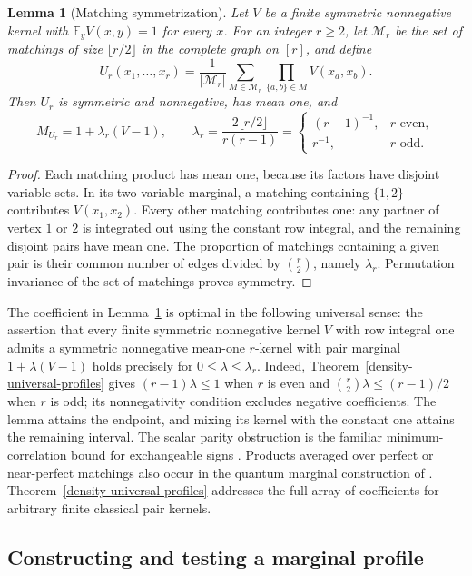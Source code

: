 \documentclass[a4paper,11pt,reqno]{amsart}
\theoremstyle{plain}
\newtheorem{lemma}[theorem]{Lemma}
\theoremstyle{definition}
\theoremstyle{remark}
\begin{document}
\begin{lemma}[Matching symmetrization]\label{density-matching}
Let $V$ be a finite symmetric nonnegative kernel with
$\mathbb E_y V(x,y)=1$ for every $x$.  For an integer $r\ge2$, let
$\mathcal M_r$ be the set of matchings of size $\lfloor r/2\rfloor$
in the complete graph on $[r]$, and define
\[
 U_r(x_1,\ldots,x_r)=
 \frac{1}{|\mathcal M_r|}
 \sum_{M\in\mathcal M_r}\prod_{\{a,b\}\in M}V(x_a,x_b).
\]
Then $U_r$ is symmetric and nonnegative, has mean one, and
\[
 M_{U_r}=1+\lambda_r(V-1),\qquad
 \lambda_r=\frac{2\lfloor r/2\rfloor}{r(r-1)}
 =\begin{cases}(r-1)^{-1},&r\text{ even},\\ r^{-1},&r\text{ odd}.
 \end{cases}
\]
\end{lemma}
\begin{proof}
Each matching product has mean one, because its factors have disjoint
variable sets.  In its two-variable marginal, a matching containing
$\{1,2\}$ contributes $V(x_1,x_2)$.  Every other matching contributes
one: any partner of vertex $1$ or $2$ is integrated out using the
constant row integral, and the remaining disjoint pairs have mean one.
The proportion of matchings containing a given pair is their common
number of edges divided by $\binom r2$, namely $\lambda_r$.
Permutation invariance of the set of matchings proves symmetry.
\end{proof}

The coefficient in Lemma~\ref{density-matching} is optimal in the
following universal sense: the assertion that every finite symmetric
nonnegative kernel $V$ with row integral one admits a symmetric
nonnegative mean-one $r$-kernel with pair marginal $1+\lambda(V-1)$ holds
precisely for $0\le\lambda\le\lambda_r$.
Indeed, Theorem~\ref{density-universal-profiles} gives
$(r-1)\lambda\le1$ when $r$ is even and
$\binom r2\lambda\le(r-1)/2$ when $r$ is odd; its nonnegativity
condition excludes negative coefficients.  The lemma attains the
endpoint, and mixing its kernel with the constant one attains the
remaining interval.
The scalar parity obstruction is the familiar minimum-correlation
bound for exchangeable signs \citep{hoernig2018}.
Products averaged over perfect or near-perfect matchings also occur
in the quantum marginal construction of
\citet[Lemma~4.4]{allerstorfer2026}.
Theorem~\ref{density-universal-profiles} addresses the full array of
coefficients for arbitrary finite classical pair kernels.


\subsection{Constructing and testing a marginal profile}
\end{document}
